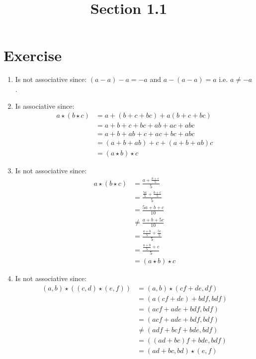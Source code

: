\documentclass{article}
\title{Section 1.1}
\begin{document}
\maketitle
\section{Exercise}
\begin{enumerate}[label=(\alph*)]
    \item Is not associative since: $(a - a) - a = -a$ and $a - (a - a) = a$
    i.e. $a \neq -a$.
    \item Is associative since:
    \begin{align*}
        a \star (b \star c) &= a + (b + c + bc) + a(b + c + bc) \\
        &= a + b + c + bc + ab + ac + abc \\
        &= a + b + ab + c + ac + bc + abc \\
        &= (a + b + ab) + c + (a + b + ab)c \\
        &= (a \star b) \star c 
    \end{align*}
    \item Is not associative since:
    \begin{align*}
        a \star (b \star c) &= \frac{a + \frac{b + c}{5}}{5} \\
        &= \frac{\frac{5a}{5} + \frac{b + c}{5}}{5} \\
        &= \frac{5a + b + c}{10} \\
        &\neq \frac{a + b + 5c}{10} \\
        &= \frac{\frac{a + b}{5} + \frac{5c}{5}}{5} \\
        &= \frac{\frac{a + b}{5} + c}{5} \\
        &= (a \star b) \star c 
    \end{align*}
    \item Is not associative since:
    \begin{align*}
        (a, b) \star ((c, d) \star (e, f)) &= (a, b) \star (cf + de, df)  \\
        &= (a(cf + de) + bdf, bdf) \\
        &= (acf + ade + bdf, bdf) \\
        &= (acf + ade + bdf, bdf) \\
        &\neq (adf + bcf + bde, bdf) \\
        &= ((ad + bc)f + bde, bdf) \\
        &= (ad + bc, bd) \star (e, f) \\

\end{align*}
\end{enumerate}
\end{document}
